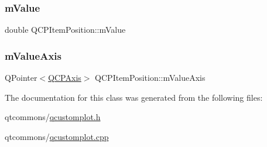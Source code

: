 \subsubsection{\texorpdfstring{mValue}{mValue}}
{\footnotesize\ttfamily double Q\+C\+P\+Item\+Position\+::m\+Value\hspace{0.3cm}{\ttfamily [protected]}}

\mbox{\label{class_q_c_p_item_position_a505dc2da24ba274452c1c817fcaba011}} 
\subsubsection{\texorpdfstring{mValueAxis}{mValueAxis}}
{\footnotesize\ttfamily Q\+Pointer$<$\mbox{\hyperlink{class_q_c_p_axis}{Q\+C\+P\+Axis}}$>$ Q\+C\+P\+Item\+Position\+::m\+Value\+Axis\hspace{0.3cm}{\ttfamily [protected]}}



The documentation for this class was generated from the following files\+:\begin{DoxyCompactItemize}
\item 
qtcommons/\mbox{\hyperlink{qcustomplot_8h}{qcustomplot.\+h}}\item 
qtcommons/\mbox{\hyperlink{qcustomplot_8cpp}{qcustomplot.\+cpp}}\end{DoxyCompactItemize}
